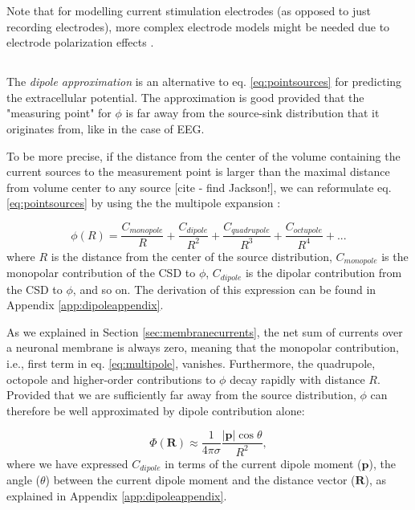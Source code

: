 Note that for modelling current stimulation electrodes (as opposed to just recording electrodes), more complex electrode models might be needed due to electrode polarization effects \citep{McIntyre2001, Martinsen2008, Joucla2012}.


\subsection{}
\label{sec:dipole}
The \textit{dipole approximation}  is an alternative to eq. \ref{eq:pointsources} for predicting the extracellular potential. The approximation is good provided that the "measuring point" for $\phi$ is far away from the source-sink distribution that it originates from, like in the case of EEG.

To be more precise, if the distance from the center of the volume containing the current sources to the measurement point is larger than the maximal distance from volume center to any source [cite - find Jackson!], we can reformulate eq. \ref{eq:pointsources} by using the the multipole expansion \citep{Nunez2006}:

\begin{equation}
\phi(R) = \frac{C_{monopole}}{R} + \frac{C_{dipole}}{R^2} + \frac{C_{quadrupole}}{R^3} + \frac{C_{octupole}}{R^4} + ...
\label{eq:multipole}
\end{equation}
where $R$ is the distance from the center of the source distribution, $C_{monopole}$ is the monopolar contribution of the CSD to $\phi$, $C_{dipole}$ is the dipolar contribution from the CSD to $\phi$, and so on. The derivation of this expression can be found in Appendix \ref{app:dipoleappendix}. 

As we explained in Section \ref{sec:membranecurrents}, the net sum of currents over a neuronal membrane is always zero, meaning that the monopolar contribution, i.e., first term in eq. \ref{eq:multipole}, vanishes. Furthermore, the quadrupole, octopole and higher-order contributions to $\phi$ decay rapidly with distance $R$. Provided that we are sufficiently far away from the source distribution, $\phi$ can therefore be well approximated by dipole contribution alone:

\begin{equation}\label{eq:CDA}
\Phi(\mathbf{R}) \approx \frac{1}{4 \pi \sigma} \frac{|\mathbf{p}| \cos \theta}{R^2},
\end{equation}
where we have expressed $C_{dipole}$ in terms of the current dipole moment ($\mathbf{p}$), the angle ($\theta$) between the current dipole moment and the distance vector ($\mathbf{R}$), as explained in Appendix \ref{app:dipoleappendix}. 

